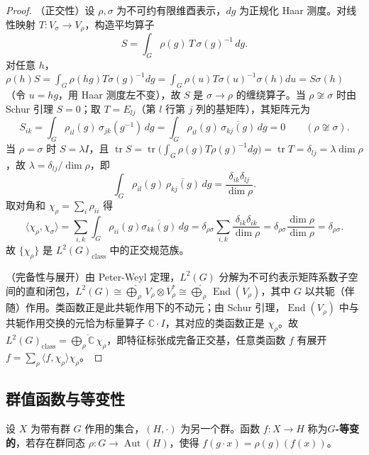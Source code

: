 \begin{proof}
（正交性）设 $\rho,\sigma$ 为不可约有限维酉表示，$dg$ 为正规化 Haar 测度。对线性映射 $T:V_\sigma\to V_\rho$，构造平均算子
\[
S=\int_G \rho(g)\,T\,\sigma(g)^{-1}\,dg.
\]
对任意 $h$，$\rho(h)S=\int_G\rho(hg)T\sigma(g)^{-1}dg=\int_G\rho(u)T\sigma(u)^{-1}\sigma(h)du=S\sigma(h)$（令 $u=hg$，用 Haar 测度左不变），故 $S$ 是 $\sigma\to\rho$ 的缠绕算子。当 $\rho\not\cong\sigma$ 时由 Schur 引理 $S=0$；取 $T=E_{lj}$（第 $l$ 行第 $j$ 列的基矩阵），其矩阵元为
\[
S_{ik}=\int_G \rho_{il}(g)\,\sigma_{jk}(g^{-1})\,dg=\int_G \rho_{il}(g)\,\overline{\sigma_{kj}(g)}\,dg=0 \qquad(\rho\not\cong\sigma).
\]
当 $\rho=\sigma$ 时 $S=\lambda I$，且 $\operatorname{tr}S=\operatorname{tr}\big(\int_G\rho(g)T\rho(g)^{-1}dg\big)=\operatorname{tr}T=\delta_{lj}=\lambda\dim\rho$，故 $\lambda=\delta_{lj}/\dim\rho$，即
\[
\int_G \rho_{il}(g)\,\overline{\rho_{kj}(g)}\,dg = \frac{\delta_{ik}\delta_{lj}}{\dim\rho}.
\]
取对角和 $\chi_\rho=\sum_i\rho_{ii}$ 得
\[
\langle\chi_\rho,\chi_\sigma\rangle=\sum_{i,k}\int_G\rho_{ii}(g)\overline{\sigma_{kk}(g)}\,dg=\delta_{\rho\sigma}\sum_{i,k}\frac{\delta_{ik}\delta_{ik}}{\dim\rho}=\delta_{\rho\sigma}\frac{\dim\rho}{\dim\rho}=\delta_{\rho\sigma}.
\]
故 $\{\chi_\rho\}$ 是 $L^2(G)_{\text{class}}$ 中的正交规范族。

（完备性与展开）由 Peter-Weyl 定理，$L^2(G)$ 分解为不可约表示矩阵系数子空间的直和闭包，$L^2(G)\cong\widehat{\bigoplus}_\rho\,V_\rho\otimes V_\rho^*\cong\widehat{\bigoplus}_\rho\,\operatorname{End}(V_\rho)$，其中 $G$ 以共轭（伴随）作用。类函数正是此共轭作用下的不动元；由 Schur 引理，$\operatorname{End}(V_\rho)$ 中与共轭作用交换的元恰为标量算子 $\mathbb{C}\cdot I$，其对应的类函数正是 $\chi_\rho$。故 $L^2(G)_{\text{class}}=\overline{\bigoplus_\rho\mathbb{C}\,\chi_\rho}$，即特征标张成完备正交基，任意类函数 $f$ 有展开 $f=\sum_\rho\langle f,\chi_\rho\rangle\chi_\rho$。
\end{proof}

\subsection{群值函数与等变性}

\begin{definition}[群值函数与等变性]\label{def:group_valued_function}
设 $X$ 为带有群 $G$ 作用的集合，$(H,\cdot)$ 为另一个群。函数 $f: X \to H$ 称为\textbf{$G$-等变的}，若存在群同态 $\rho: G \to \operatorname{Aut}(H)$，使得 $f(g \cdot x) = \rho(g)(f(x))$。
\end{definition}

